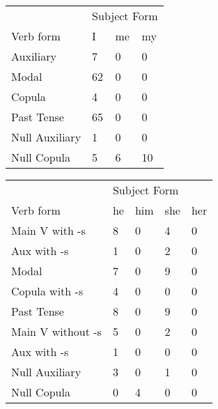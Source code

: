 \begin{table}[]
\begin{minipage}{0.5\textwidth}
    \centering
    \begin{tabular}{@{}llll@{}}
        \toprule
            &\multicolumn{3}{l}{Subject Form}\\
            \cline{2-4}
        Verb form & I & me & my \\
        \midrule
        Auxiliary & 7 & 0 & 0 \\
        Modal & 62 & 0 & 0 \\
        Copula & 4 & 0 & 0 \\
        Past Tense & 65 & 0 & 0 \\
        \hline
        Null Auxiliary & 1 & 0 & 0 \\
        Null Copula & 5 & 6 & 10 \\
        \bottomrule
    \end{tabular}
\end{minipage}
\begin{minipage}{0.5\textwidth}
    \centering
    \begin{tabular}{@{}lllll@{}}
        \toprule
            &\multicolumn{4}{l}{Subject Form}\\
            \cline{2-5}
        Verb form & he & him & she & her \\
        \midrule
        Main V with -s & 8 & 0 & 4 & 0 \\
        Aux with -s & 1 & 0 & 2 & 0 \\
        Modal & 7 & 0 & 9 & 0 \\
        Copula with -s & 4 & 0 & 0 & 0 \\
        Past Tense & 8 & 0 & 9 & 0 \\
        \hline
        Main V without -s & 5 & 0 & 2 & 0 \\
        Aux with -s & 1 & 0 & 0 & 0 \\
        Null Auxiliary & 3 & 0 & 1 & 0 \\
        Null Copula & 0 & 4 & 0 & 0 \\
        \bottomrule
    \end{tabular}
    \end{minipage}
\end{table}
